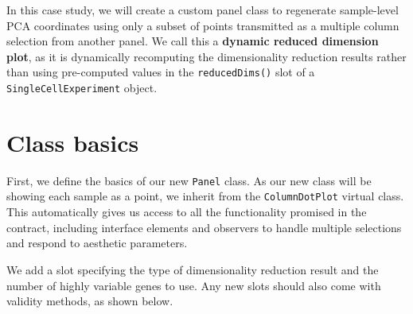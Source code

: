 \documentclass[
]{book}
\newenvironment{Shaded}{\begin{snugshade}}{\end{snugshade}}
\newcommand{\ControlFlowTok}[1]{\textcolor[rgb]{0.13,0.29,0.53}{\textbf{#1}}}
\newcommand{\DecValTok}[1]{\textcolor[rgb]{0.00,0.00,0.81}{#1}}
\newcommand{\KeywordTok}[1]{\textcolor[rgb]{0.13,0.29,0.53}{\textbf{#1}}}
\newcommand{\NormalTok}[1]{#1}
\newcommand{\OperatorTok}[1]{\textcolor[rgb]{0.81,0.36,0.00}{\textbf{#1}}}
\newcommand{\OtherTok}[1]{\textcolor[rgb]{0.56,0.35,0.01}{#1}}
\newcommand{\StringTok}[1]{\textcolor[rgb]{0.31,0.60,0.02}{#1}}
\begin{document}
In this case study, we will create a custom panel class to regenerate sample-level PCA coordinates using only a subset of points transmitted as a multiple column selection from another panel.
We call this a \textbf{dynamic reduced dimension plot}, as it is dynamically recomputing the dimensionality reduction results rather than using pre-computed values in the \texttt{reducedDims()} slot of a \texttt{SingleCellExperiment} object.

\hypertarget{class-basics}{%
\section{Class basics}\label{class-basics}}

First, we define the basics of our new \texttt{Panel} class.
As our new class will be showing each sample as a point, we inherit from the \texttt{ColumnDotPlot} virtual class.
This automatically gives us access to all the functionality promised in the contract,
including interface elements and observers to handle multiple selections and respond to aesthetic parameters.

We add a slot specifying the type of dimensionality reduction result and the number of highly variable genes to use.
Any new slots should also come with validity methods, as shown below.

\begin{Shaded}
\end{Shaded}
\end{document}

